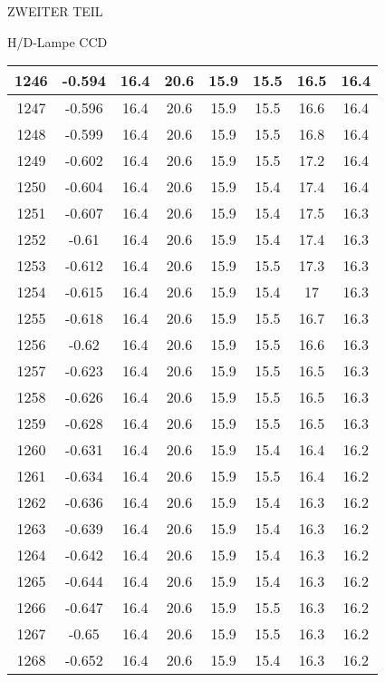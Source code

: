\begin{appendix}
\begin{chapter}{ZWEITER TEIL}
\begin{section}{H/D-Lampe CCD}
\begin{scriptsize}
\begin{longtable}[htbp]{|c|c|c|c|c|c|c|c|}
            1246 & -0.594 & 16.4 & 20.6 & 15.9 & 15.5 & 16.5 & 16.4 \\ \hline
            1247 & -0.596 & 16.4 & 20.6 & 15.9 & 15.5 & 16.6 & 16.4 \\ \hline
            1248 & -0.599 & 16.4 & 20.6 & 15.9 & 15.5 & 16.8 & 16.4 \\ \hline
            1249 & -0.602 & 16.4 & 20.6 & 15.9 & 15.5 & 17.2 & 16.4 \\ \hline
            1250 & -0.604 & 16.4 & 20.6 & 15.9 & 15.4 & 17.4 & 16.4 \\ \hline
            1251 & -0.607 & 16.4 & 20.6 & 15.9 & 15.4 & 17.5 & 16.3 \\ \hline
            1252 & -0.61 & 16.4 & 20.6 & 15.9 & 15.4 & 17.4 & 16.3 \\ \hline
            1253 & -0.612 & 16.4 & 20.6 & 15.9 & 15.5 & 17.3 & 16.3 \\ \hline
            1254 & -0.615 & 16.4 & 20.6 & 15.9 & 15.4 & 17 & 16.3 \\ \hline
            1255 & -0.618 & 16.4 & 20.6 & 15.9 & 15.5 & 16.7 & 16.3 \\ \hline
            1256 & -0.62 & 16.4 & 20.6 & 15.9 & 15.5 & 16.6 & 16.3 \\ \hline
            1257 & -0.623 & 16.4 & 20.6 & 15.9 & 15.5 & 16.5 & 16.3 \\ \hline
            1258 & -0.626 & 16.4 & 20.6 & 15.9 & 15.5 & 16.5 & 16.3 \\ \hline
            1259 & -0.628 & 16.4 & 20.6 & 15.9 & 15.5 & 16.5 & 16.3 \\ \hline
            1260 & -0.631 & 16.4 & 20.6 & 15.9 & 15.4 & 16.4 & 16.2 \\ \hline
            1261 & -0.634 & 16.4 & 20.6 & 15.9 & 15.5 & 16.4 & 16.2 \\ \hline
            1262 & -0.636 & 16.4 & 20.6 & 15.9 & 15.4 & 16.3 & 16.2 \\ \hline
            1263 & -0.639 & 16.4 & 20.6 & 15.9 & 15.4 & 16.3 & 16.2 \\ \hline
            1264 & -0.642 & 16.4 & 20.6 & 15.9 & 15.4 & 16.3 & 16.2 \\ \hline
            1265 & -0.644 & 16.4 & 20.6 & 15.9 & 15.4 & 16.3 & 16.2 \\ \hline
            1266 & -0.647 & 16.4 & 20.6 & 15.9 & 15.5 & 16.3 & 16.2 \\ \hline
            1267 & -0.65 & 16.4 & 20.6 & 15.9 & 15.5 & 16.3 & 16.2 \\ \hline
            1268 & -0.652 & 16.4 & 20.6 & 15.9 & 15.4 & 16.3 & 16.2 \\ \hline

\end{longtable}
\end{scriptsize}
\end{section}
\end{chapter}
\end{appendix}
